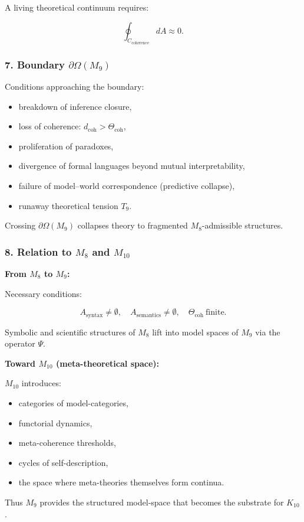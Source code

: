 A living theoretical continuum requires:

\[
\oint_{C_{\mathrm{coherence}}} dA \approx 0.
\]

\subsubsection*{7. Boundary \texorpdfstring{$\partial\Omega(M_9)$}{\partial\Omega(M_9)}}

Conditions approaching the boundary:

\begin{itemize}
    \item breakdown of inference closure,
    \item loss of coherence: $d_{\mathrm{coh}}>\Theta_{\mathrm{coh}}$,
    \item proliferation of paradoxes,
    \item divergence of formal languages beyond mutual interpretability,
    \item failure of model–world correspondence (predictive collapse),
    \item runaway theoretical tension $T_9$.
\end{itemize}

Crossing $\partial\Omega(M_9)$ collapses theory to fragmented $M_8$-admissible structures.

\subsubsection*{8. Relation to \texorpdfstring{$M_8$}{M_8} and $M_{10}$}

\textbf{From $M_8$ to $M_9$:}

Necessary conditions:

\[
A_{\mathrm{syntax}}\neq\emptyset,
\quad
A_{\mathrm{semantics}}\neq\emptyset,
\quad
\Theta_{\mathrm{coh}}\ \text{finite}.
\]

Symbolic and scientific structures of $M_8$ lift into
model spaces of $M_9$ via the operator $\Psi$.

\textbf{Toward $M_{10}$ (meta-theoretical space):}

$M_{10}$ introduces:

\begin{itemize}
    \item categories of model-categories,
    \item functorial dynamics,
    \item meta-coherence thresholds,
    \item cycles of self-description,
    \item the space where meta-theories themselves form continua.
\end{itemize}

Thus $M_9$ provides the structured model-space that becomes the substrate for $K_{10}$.
